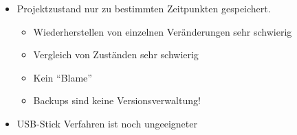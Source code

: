 \begin{frame}
    \slidehead
    \begin{itemize}
        [<+->]
        \item Projektzustand nur zu bestimmten Zeitpunkten gespeichert.
        \begin{itemize}
            \item Wiederherstellen von einzelnen Veränderungen sehr schwierig
            \item Vergleich von Zuständen sehr schwierig
            \item Kein \enquote{Blame}
            \item Backups sind keine Versionsverwaltung!
        \end{itemize}
        \item USB-Stick Verfahren ist noch ungeeigneter
    \end{itemize}
\end{frame}
